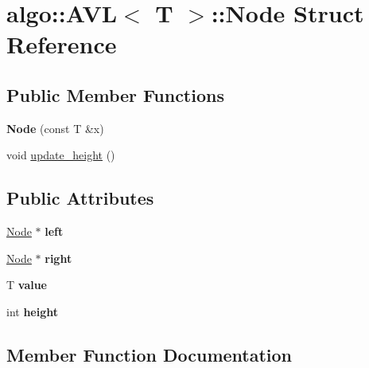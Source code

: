 \hypertarget{structalgo_1_1_a_v_l_1_1_node}{}\section{algo\+:\+:A\+VL$<$ T $>$\+:\+:Node Struct Reference}
\label{structalgo_1_1_a_v_l_1_1_node}
\subsection*{Public Member Functions}
\begin{DoxyCompactItemize}
\item 
\mbox{\label{structalgo_1_1_a_v_l_1_1_node_a78c35897fa26c365287d909b5a507e60}} 
{\bfseries Node} (const T \&x)
\item 
void \hyperlink{structalgo_1_1_a_v_l_1_1_node_a802e793f192e97faccff47afb974eff5}{update\+\_\+height} ()
\end{DoxyCompactItemize}
\subsection*{Public Attributes}
\begin{DoxyCompactItemize}
\item 
\mbox{\label{structalgo_1_1_a_v_l_1_1_node_ae79df41cbb838e00915462ea5f0f0834}} 
\hyperlink{structalgo_1_1_a_v_l_1_1_node}{Node} $\ast$ {\bfseries left}
\item 
\mbox{\label{structalgo_1_1_a_v_l_1_1_node_aa0a4e34ca810b08f6bba252a6682f3ad}} 
\hyperlink{structalgo_1_1_a_v_l_1_1_node}{Node} $\ast$ {\bfseries right}
\item 
\mbox{\label{structalgo_1_1_a_v_l_1_1_node_af036b1032778d3d98ef880801494fd46}} 
T {\bfseries value}
\item 
\mbox{\label{structalgo_1_1_a_v_l_1_1_node_a206033177a8f15418317a13b99f26b6d}} 
int {\bfseries height}
\end{DoxyCompactItemize}


\subsection{Member Function Documentation}
\mbox{\label{structalgo_1_1_a_v_l_1_1_node_a802e793f192e97faccff47afb974eff5}} 
